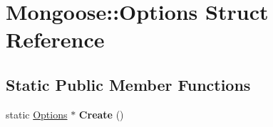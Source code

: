 \hypertarget{struct_mongoose_1_1_options}{}\section{Mongoose\+:\+:Options Struct Reference}
\label{struct_mongoose_1_1_options}
\subsection*{Static Public Member Functions}
\begin{DoxyCompactItemize}
\item 
static \hyperlink{struct_mongoose_1_1_options}{Options} $\ast$ {\bfseries Create} ()\hypertarget{struct_mongoose_1_1_options_aef92ab6958e585784c608a70e98957f0}{}\label{struct_mongoose_1_1_options_aef92ab6958e585784c608a70e98957f0}

\end{DoxyCompactItemize}
